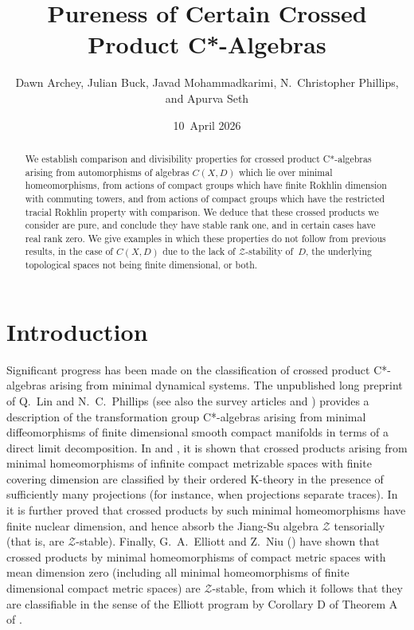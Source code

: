 \documentclass[10pt]{amsart}
\title[Pureness of Crossed Products]{Pureness of Certain Crossed Product C*-Algebras}
\author[D.\ Archey, J.\ Buck, J.\ Mohammadkarimi, N.C.\ Phillips
and A.\ Seth]{Dawn Archey, Julian Buck, Javad Mohammadkarimi,
N.~Christopher Phillips, and Apurva Seth}
\date{10~April 2026}
\numberwithin{equation}{section}
\theoremstyle{definition}
\newcommand{\cZ}{{\mathcal{Z}}}
\newcommand{\ca}{C*-algebra}
\newcommand{\JS}{\mathcal{Z}}
\begin{document}
\maketitle

\begin{abstract}
We establish comparison and divisibility properties for
crossed product C*-algebras arising from automorphisms of algebras
$C (X, D)$ which lie over minimal homeomorphisms,
from actions of compact groups which have
finite Rokhlin dimension with commuting towers,
and from actions of compact groups which have the
restricted tracial Rokhlin property with comparison.
We deduce that these crossed products we
consider are pure, and conclude they have stable rank one,
and in certain cases have real rank zero.
We give examples in which these properties
do not follow from previous results,
in the case of $C (X, D)$
due to the lack of $\JS$-stability of~$D$, the
underlying topological spaces not being finite dimensional, or both.
\end{abstract}

\section{Introduction}

Significant progress has been made on the classification of
crossed product \ca{s} arising from minimal dynamical systems.
The unpublished long preprint \cite{QLinPhDiff} of Q.~Lin
and N.~C.\  Phillips (see also the survey articles
\cite{QLinPh1} and \cite{QLinPh2}) provides a
description of the transformation group
\ca{s} arising from minimal diffeomorphisms of
finite dimensional smooth compact manifolds in
terms of a direct limit decomposition.
In \cite{HLinPh}
and \cite{TomsWinter}, it is shown that crossed
products arising from minimal homeomorphisms
of infinite compact metrizable spaces with finite covering
dimension are classified by their ordered K-theory in the
presence of sufficiently many projections (for instance,
when projections separate traces).
In \cite{TomsWinter}
it is further proved that crossed products by such minimal
homeomorphisms have finite nuclear dimension, and
hence absorb the Jiang-Su algebra $\cZ$ tensorially
(that is, are $\cZ$-stable).
Finally, G.~A.\  Elliott and
Z.~Niu (\cite{EllNiu}) have shown that crossed products
by minimal homeomorphisms of compact metric spaces
with mean dimension zero (including all minimal
homeomorphisms of finite dimensional compact
metric spaces) are ${\mathcal{Z}}$-stable, from which
it follows that they are classifiable in the sense of the
Elliott program by Corollary D of Theorem A of \cite{CETWW}.
\end{document}
